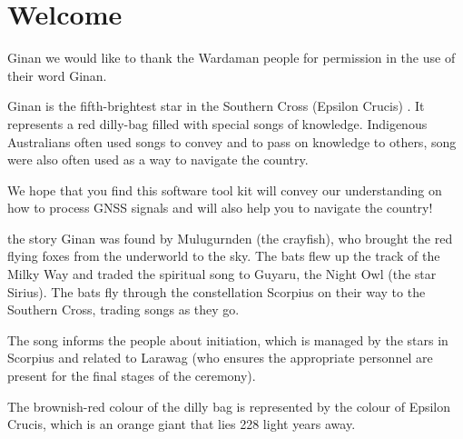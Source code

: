\chapter{Welcome}
\label{ch:Ginan}


Ginan we would like to thank the Wardaman people for permission in the use of their word Ginan. 

Ginan is the fifth-brightest star in the Southern Cross (Epsilon Crucis) . It represents a red dilly-bag filled with special songs of knowledge.
Indigenous Australians often used songs to convey and to pass on knowledge to others, song were also often used as a way to navigate the country.

We hope that you find this software tool kit will convey our understanding on how to process GNSS signals and will also help you to navigate the country!

the story Ginan was found by Mulugurnden (the crayfish), who brought the red flying foxes from the underworld to the sky. The bats flew up the track of the Milky Way and traded the spiritual song to Guyaru, the Night Owl (the star Sirius). The bats fly through the constellation Scorpius on their way to the Southern Cross, trading songs as they go.

The song informs the people about initiation, which is managed by the stars in Scorpius and related to Larawag (who ensures the appropriate personnel are present for the final stages of the ceremony).

The brownish-red colour of the dilly bag is represented by the colour of Epsilon Crucis, which is an orange giant that lies 228 light years away.